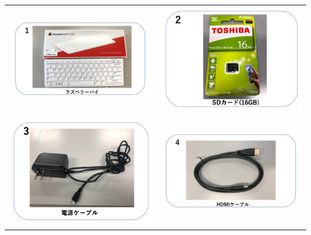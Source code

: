 \begin{tabular}{cc}
  \includegraphics[width=6.488cm,height=4.697cm]{text01-img/textbook-img009-2023.png}
   &
  \includegraphics[width=6.488cm,height=4.697cm]{text01-img/textbook-img010.png} \\

  \includegraphics[width=6.488cm,height=4.697cm]{text01-img/textbook-img007.png}
   &
  \includegraphics[width=6.488cm,height=4.697cm]{text01-img/textbook-img008-2023.png} \\


\end{tabular}
